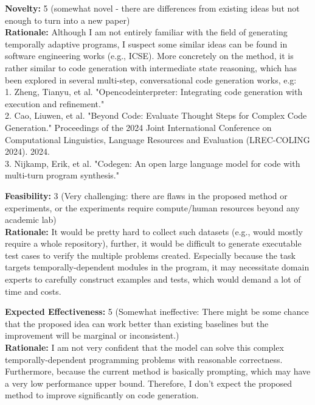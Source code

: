 \vspace{20pt}

\begin{tcolorbox}[colback=green!10!white, colframe=green!80!black, title=\textbf{Reviewer 2}]
\small
\textbf{Novelty:} 5 (somewhat novel - there are differences from existing ideas but not enough to turn into a new paper)\\
\textbf{Rationale:} Although I am not entirely familiar with the field of generating temporally adaptive programs, I suspect some similar ideas can be found in software engineering works (e.g., ICSE). More concretely on the method, it is rather similar to code generation with intermediate state reasoning, which has been explored in several multi-step, conversational code generation works, e.g: \\
1. Zheng, Tianyu, et al. "Opencodeinterpreter: Integrating code generation with execution and refinement."\\
2. Cao, Liuwen, et al. "Beyond Code: Evaluate Thought Steps for Complex Code Generation." Proceedings of the 2024 Joint International Conference on Computational Linguistics, Language Resources and Evaluation (LREC-COLING 2024). 2024.\\
3. Nijkamp, Erik, et al. "Codegen: An open large language model for code with multi-turn program synthesis."

\vspace{10pt}

\textbf{Feasibility:} 3 (Very challenging: there are flaws in the proposed method or experiments, or the experiments require compute/human resources beyond any academic lab)\\
\textbf{Rationale:} It would be pretty hard to collect such datasets (e.g., would mostly require a whole repository), further, it would be difficult to generate executable test cases to verify the multiple problems created. Especially because the task targets temporally-dependent modules in the program, it may necessitate domain experts to carefully construct examples and tests, which would demand a lot of time and costs.

\vspace{10pt}

\textbf{Expected Effectiveness:} 5 (Somewhat ineffective: There might be some chance that the proposed idea can work better than existing baselines but the improvement will be marginal or inconsistent.)\\
\textbf{Rationale:} I am not very confident that the model can solve this complex temporally-dependent programming problems with reasonable correctness. Furthermore, because the current method is basically prompting, which may have a very low performance upper bound. Therefore, I don't expect the proposed method to improve significantly on code generation.


\end{tcolorbox}

